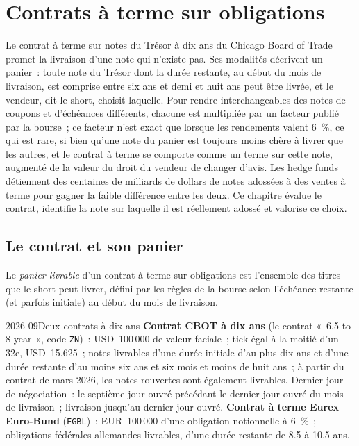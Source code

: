 \chapter{Contrats à terme sur obligations}\label{ch:m2:bond-futures}

Le contrat à terme sur notes du Trésor à dix ans du Chicago Board of Trade promet la livraison
d'une note qui n'existe pas. Ses modalités
décrivent un panier~: toute note du Trésor dont la durée restante, au début du mois de livraison, est comprise
entre six ans et demi et huit ans peut être livrée, et le vendeur, dit le short, choisit
laquelle. Pour rendre interchangeables des notes de coupons et d'échéances différents, chacune
est multipliée par un facteur publié par la bourse~; ce facteur n'est exact que lorsque les rendements
valent 6~\%, ce qui est rare, si bien qu'une note du panier est toujours moins chère à livrer
que les autres, et le contrat à terme se comporte comme un terme sur cette note,
augmenté de la valeur du droit du vendeur de changer d'avis. Les
hedge funds détiennent des centaines de milliards de
dollars de notes adossées à des ventes à terme pour gagner la faible différence entre
les deux. Ce chapitre évalue le contrat, identifie la note sur laquelle il est réellement
adossé et valorise ce choix.

\section{Le contrat et son panier}

\begin{definition}\label{def:m2:bond-futures:basket}
Le \emph{panier livrable} d'un contrat à terme sur obligations est
l'ensemble des titres que le short peut livrer, défini par les règles de la bourse
selon l'échéance restante (et parfois initiale) au début du
mois de livraison.
\end{definition}

\begin{dated}{2026-09}{Deux contrats à dix ans}\label{dat:m2:bond-futures:contracts}
\textbf{Contrat CBOT à dix ans} (le contrat «~6.5 to 8-year~»,
code \texttt{ZN})~: USD~100\,000 de valeur faciale~; tick égal à la moitié d'un 32e, USD~15.625~; notes livrables
d'une durée initiale d'au plus dix ans et d'une durée restante d'au moins
six ans et six mois et moins de huit ans~; à partir du contrat de mars 2026,
les notes rouvertes sont également livrables. Dernier jour de négociation~: le
septième jour ouvré précédant le dernier jour ouvré du mois de livraison~;
livraison jusqu'au dernier jour ouvré. \textbf{Contrat à terme Eurex Euro-Bund}
(\texttt{FGBL})~: EUR~100\,000 d'une obligation notionnelle à 6~\%~; obligations
fédérales allemandes livrables, d'une durée restante de 8.5 à 10.5 ans.
\end{dated}

